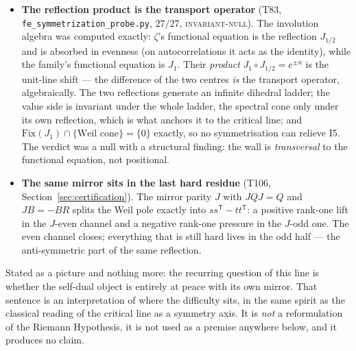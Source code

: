 \documentclass[11pt,a4paper]{article}
\begin{document}
\begin{itemize}[leftmargin=1.5em]
\item \textbf{The reflection product is the transport operator} (T83,
\texttt{fe\_symmetrization\_probe.py}, $27/27$, \textsc{invariant-null}). The involution algebra was
computed exactly: $\zeta$'s functional equation is the reflection $J_{1/2}$ and is absorbed in evenness
(on autocorrelations it acts as the identity), while the family's functional equation is $J_1$. Their
\emph{product} $J_1\circ J_{1/2}=e^{\pm u}$ is the unit-line shift --- the difference of the two centres
\emph{is} the transport operator, algebraically. The two reflections generate an infinite dihedral
ladder; the value side is invariant under the whole ladder, the spectral cone only under its own
reflection, which is what anchors it to the critical line; and $\mathrm{Fix}(J_1)\cap\{\text{Weil
cone}\}=\{0\}$ exactly, so no symmetrisation can relieve I5. The verdict was a null with a structural
finding: the wall is \emph{transversal} to the functional equation, not positional.
\item \textbf{The same mirror sits in the last hard residue} (T106, Section~\ref{sec:certification}).
The mirror parity $J$ with $JQJ=Q$ and $JB=-BR$ splits the Weil pole exactly into
$ss^{\mathsf T}-tt^{\mathsf T}$: a positive rank-one lift in the $J$-even channel and a negative
rank-one pressure in the $J$-odd one. The even channel closes; everything that is still hard lives in
the odd half --- the anti-symmetric part of the same reflection.
\end{itemize}

\noindent Stated as a picture and nothing more: the recurring question of this line is whether the
self-dual object is entirely at peace with its own mirror. That sentence is an interpretation of where
the difficulty sits, in the same spirit as the classical reading of the critical line as a symmetry
axis. It is \emph{not} a reformulation of the Riemann Hypothesis, it is not used as a premise anywhere
below, and it produces no claim.
\end{document}
